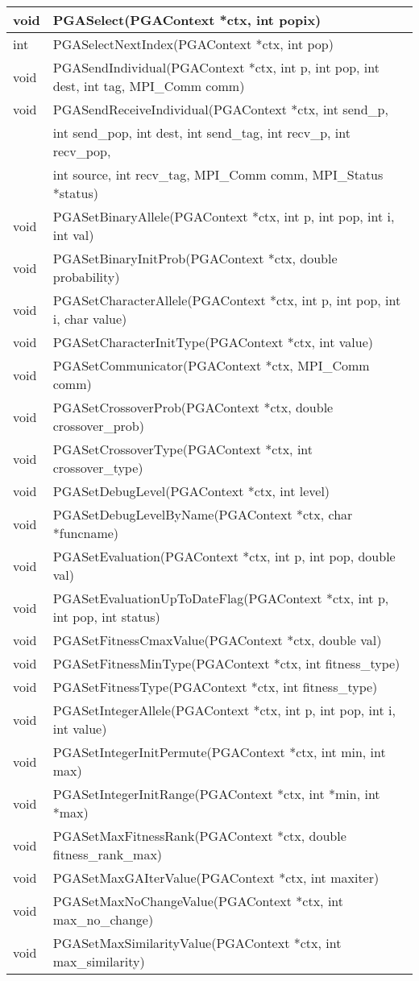 \documentclass{report}
\begin{document}
\begin{tabular}{|l|l|}
void &  PGASelect(PGAContext *ctx, int popix) \\ \hline
int &  PGASelectNextIndex(PGAContext *ctx, int pop) \\ \hline
void &  PGASendIndividual(PGAContext *ctx, int p, int pop, int dest, int tag,
MPI\_Comm comm) \\ \hline
void &  PGASendReceiveIndividual(PGAContext *ctx, int send\_p, \\
     &  int send\_pop, int dest, int send\_tag, int recv\_p, int recv\_pop, \\
     &  int source, int recv\_tag, MPI\_Comm comm, MPI\_Status *status) \\ \hline
void &  PGASetBinaryAllele(PGAContext *ctx, int p, int pop, int i, int val) \\
\hline
void &  PGASetBinaryInitProb(PGAContext *ctx, double probability) \\ \hline
void &  PGASetCharacterAllele(PGAContext *ctx, int p, int pop, int i, char
value) \\ \hline
void &  PGASetCharacterInitType(PGAContext *ctx, int value) \\ \hline
void &  PGASetCommunicator(PGAContext *ctx, MPI\_Comm comm) \\ \hline
void &  PGASetCrossoverProb(PGAContext *ctx, double crossover\_prob) \\ \hline
void &  PGASetCrossoverType(PGAContext *ctx, int crossover\_type) \\ \hline
void &  PGASetDebugLevel(PGAContext *ctx, int level) \\ \hline
void &  PGASetDebugLevelByName(PGAContext *ctx, char *funcname) \\ \hline
void &  PGASetEvaluation(PGAContext *ctx, int p, int pop, double val) \\ \hline
void &  PGASetEvaluationUpToDateFlag(PGAContext *ctx, int p, int pop, int
status) \\ \hline
void &  PGASetFitnessCmaxValue(PGAContext *ctx, double val) \\ \hline
void &  PGASetFitnessMinType(PGAContext *ctx, int fitness\_type) \\ \hline
void &  PGASetFitnessType(PGAContext *ctx, int fitness\_type) \\ \hline
void &  PGASetIntegerAllele(PGAContext *ctx, int p, int pop, int i, int value)
\\ \hline
void &  PGASetIntegerInitPermute(PGAContext *ctx, int min, int max) \\ \hline
void &  PGASetIntegerInitRange(PGAContext *ctx, int *min, int *max) \\ \hline
void &  PGASetMaxFitnessRank(PGAContext *ctx, double fitness\_rank\_max) \\ \hline
void &  PGASetMaxGAIterValue(PGAContext *ctx, int maxiter) \\ \hline
void &  PGASetMaxNoChangeValue(PGAContext *ctx, int max\_no\_change) \\ \hline
void &  PGASetMaxSimilarityValue(PGAContext *ctx, int max\_similarity) \\ \hline
\end{tabular}
\end{document}
